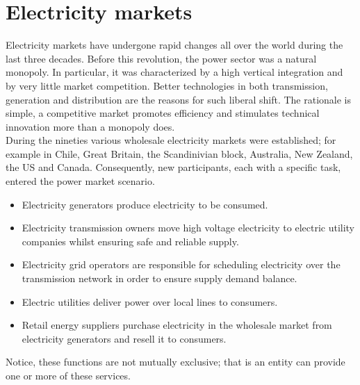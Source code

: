 \section{Electricity markets}
Electricity markets have undergone rapid changes all over the world during the last three decades.
Before this revolution, the power sector was a natural monopoly. In particular, it was characterized by a high vertical integration and by very little market competition. Better technologies in both transmission, generation and distribution are the reasons for such liberal shift. The rationale is simple, a competitive market promotes efficiency and stimulates technical innovation more than a monopoly does.
\\
During the nineties various wholesale electricity markets were established; for example in Chile, Great Britain, the Scandinivian block, Australia, New Zealand, the US and Canada. Consequently, new participants, each with a specific task, entered the power market scenario.
\begin{itemize}
    \item Electricity generators produce electricity to be consumed.
    \item Electricity transmission owners 
    move high voltage electricity to electric utility companies whilst ensuring safe and reliable supply.
    \item Electricity grid operators are responsible for scheduling electricity over the transmission network in order to ensure supply demand balance.
    \item Electric utilities deliver power over local lines to consumers. 
    \item Retail energy suppliers purchase electricity in the wholesale market from electricity generators and resell it to consumers.
\end{itemize}
Notice, these functions are not mutually exclusive; that is an entity can provide one or more of these services.



